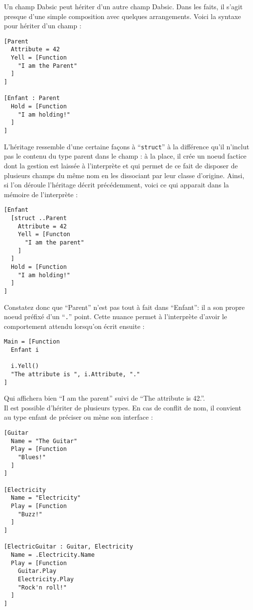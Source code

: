 \documentclass[a5paper, 12pt]{book}
\begin{document}
Un champ Dabsic peut hériter d'un autre champ Dabsic.
Dans les faits, il s'agit presque d'une simple
composition avec quelques arrangements. Voici la
syntaxe pour hériter d'un champ :\\

\begin{verbatim}
[Parent
  Attribute = 42
  Yell = [Function
    "I am the Parent"
  ]
]

[Enfant : Parent
  Hold = [Function
    "I am holding!"
  ]
]
\end{verbatim}

L'héritage  ressemble d'une certaine façons à ``\verb!struct!'' à la
différence qu'il n'inclut pas le contenu du type parent
dans le champ : à la place, il crée un noeud factice dont
la gestion est laissée à l'interprète et qui permet de ce
fait de disposer de plusieurs champs du même nom en les
dissociant par leur classe d'origine. Ainsi, si l'on
déroule l'héritage décrit précédemment, voici ce qui
apparait dans la mémoire de l'interprète :\\

\begin{verbatim}
[Enfant
  [struct ..Parent
    Attribute = 42
    Yell = [Functon
      "I am the parent"
    ]
  ]
  Hold = [Function
    "I am holding!"
  ]
]
\end{verbatim}

Constatez donc que ``Parent'' n'est pas tout à fait dans
``Enfant'': il a son propre noeud préfixé d'un ``\verb!.!'' point.
Cette nuance permet à l'interprète d'avoir le comportement
attendu lorsqu'on écrit ensuite :\\

\begin{verbatim}
Main = [Function
  Enfant i

  i.Yell()
  "The attribute is ", i.Attribute, "."
]
\end{verbatim}

Qui affichera bien ``I am the parent'' suivi de ``The attribute is 42.''.
\\

Il est possible d'hériter de plusieurs types. En cas de conflit de nom,
il convient au type enfant de préciser ou mène son interface :\\

\begin{verbatim}
[Guitar
  Name = "The Guitar"
  Play = [Function
    "Blues!"
  ]
]

[Electricity
  Name = "Electricity"
  Play = [Function
    "Buzz!"
  ]
]

[ElectricGuitar : Guitar, Electricity
  Name = .Electricity.Name
  Play = [Function
    Guitar.Play
    Electricity.Play
    "Rock'n roll!"
  ]
]
\end{verbatim}
\end{document}
